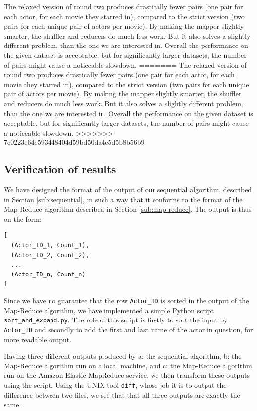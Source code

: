 \documentclass[a4paper,11pt]{article}
\begin{document}
The relaxed version of round two produces drastically fewer pairs (one pair for each actor, for each movie they starred in), compared to the strict version (two pairs for each unique pair of actors per movie). By making the mapper slightly smarter, the shuffler and reducers do much less work. But it also solves a slightly different problem, than the one we are interested in. Overall the performance on the given dataset is acceptable, but for significantly larger datasets, the number of pairs might cause a noticeable slowdown.
=======
The relaxed version of round two produces drastically fewer pairs (one pair for each actor, for each movie they starred in), compared to the strict version (two pairs for each unique pair of actors per movie). By making the mapper slightly smarter, the shuffler and reducers do much less work. But it also solves a slightly different problem, than the one we are interested in. Overall the performance on the given dataset is acceptable, but for significantly larger datasets, the number of pairs might cause a noticeable slowdown. 
>>>>>>> 7e0223e64e593448404d59bd50da4e5d5b8b56b9

\subsection{Verification of results}
We have designed the format of the output of our sequential algorithm, described in Section \ref{sub:sequential}, in such a way that it conforms to the format of the Map-Reduce algorithm described in Section \ref{sub:map-reduce}. 
The output is thus on the form:
\begin{verbatim}
[ 
  (Actor_ID_1, Count_1),
  (Actor_ID_2, Count_2),
  ...
  (Actor_ID_n, Count_n)
]
\end{verbatim}
Since we have no guarantee that the row \texttt{Actor\_ID} is sorted in the output of the Map-Reduce algorithm, we have implemented a simple Python script \texttt{sort\_and\_expand.py}. 
The role of this script is firstly to sort the input by \texttt{Actor\_ID} and secondly to add the first and last name of the actor in question, for more readable output.

Having three different outputs produced by a: the sequential algorithm, b: the Map-Reduce algorithm run on a local machine, and c: the Map-Reduce algorithm run on the Amazon Elastic MapReduce service, we then transform these outputs using the script.
Using the UNIX tool \texttt{diff}, whose job it is to output the difference between two files, we see that that all three outputs are exactly the same.
\end{document}

